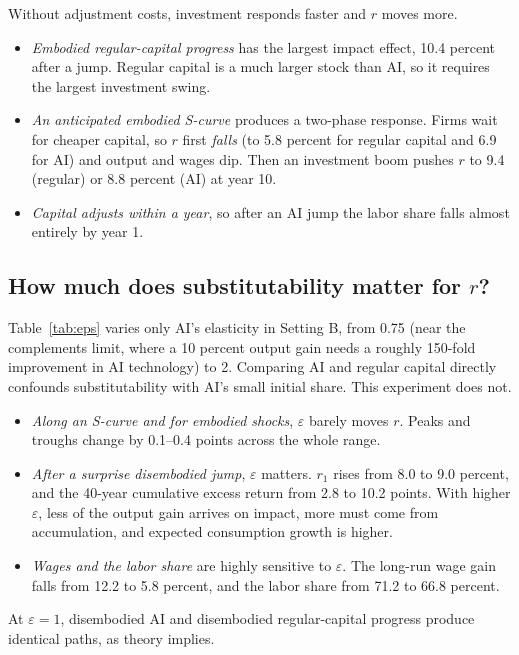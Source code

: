 \documentclass[11pt]{article}
\newcommand{\e}{\varepsilon}
\begin{document}
\begin{table}[h]\centering\scriptsize
\caption{Setting B. Columns as in Table~\ref{tab:A}.}\label{tab:B}

\end{table}

Without adjustment costs, investment responds faster and $r$ moves more.
\begin{itemize}
\item \emph{Embodied regular-capital progress} has the largest impact effect, 10.4
percent after a jump. Regular capital is a much larger stock than AI, so it requires
the largest investment swing.
\item \emph{An anticipated embodied S-curve} produces a two-phase response. Firms wait
for cheaper capital, so $r$ first \emph{falls} (to 5.8 percent for regular capital and
6.9 for AI) and output and wages dip. Then an investment boom pushes $r$ to 9.4 (regular)
or 8.8 percent (AI) at year 10.
\item \emph{Capital adjusts within a year}, so after an AI jump the labor share falls
almost entirely by year 1.
\end{itemize}

\subsection{How much does substitutability matter for $r$?}

Table~\ref{tab:eps} varies only AI's elasticity in Setting B, from 0.75 (near the
complements limit, where a 10 percent output gain needs a roughly 150-fold improvement
in AI technology) to 2. Comparing AI and regular capital directly confounds
substitutability with AI's small initial share. This experiment does not.

\begin{table}[h]\centering\scriptsize
\caption{Ramsey, Setting B, AI progress, varying $\e$. ``40-yr excess'' is $\sum_{t<40}[\ln(1+r_{t+1})-\ln 1.075]$ in percentage points.}\label{tab:eps}

\end{table}

\begin{itemize}
\item \emph{Along an S-curve and for embodied shocks}, $\e$ barely moves $r$. Peaks and
troughs change by 0.1--0.4 points across the whole range.
\item \emph{After a surprise disembodied jump}, $\e$ matters. $r_1$ rises from 8.0 to 9.0
percent, and the 40-year cumulative excess return from 2.8 to 10.2 points. With higher $\e$,
less of the output gain arrives on impact, more must come from accumulation, and expected
consumption growth is higher.
\item \emph{Wages and the labor share} are highly sensitive to $\e$. The long-run wage gain
falls from 12.2 to 5.8 percent, and the labor share from 71.2 to 66.8 percent.
\end{itemize}
At $\e=1$, disembodied AI and disembodied regular-capital progress produce identical
paths, as theory implies.
\end{document}
